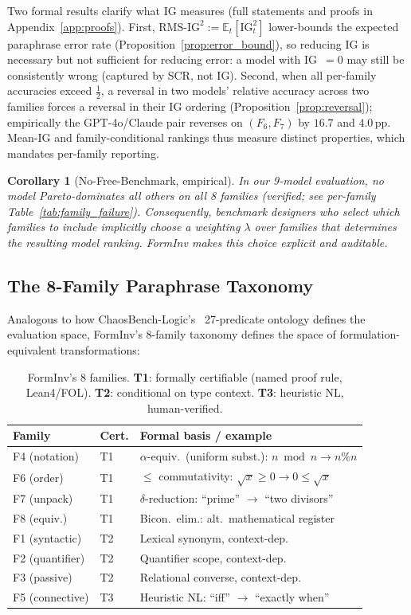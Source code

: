 \documentclass{article}
\newcommand{\IG}{\mathrm{IG}}
\newtheorem{corollary}[theorem]{Corollary}
\begin{document}
Two formal results clarify what IG measures (full statements and proofs in Appendix~\ref{app:proofs}). First, $\mathrm{RMS\text{-}IG}^2 := \mathbb{E}_t[\IG_t^2]$ lower-bounds the expected paraphrase error rate (Proposition~\ref{prop:error_bound}), so reducing IG is necessary but not sufficient for reducing error: a model with IG~$=0$ may still be consistently wrong (captured by SCR, not IG). Second, when all per-family accuracies exceed $\tfrac12$, a reversal in two models' relative accuracy across two families forces a reversal in their IG ordering (Proposition~\ref{prop:reversal}); empirically the GPT-4o/Claude pair reverses on $(F_6,F_7)$ by $16.7$ and $4.0$\,pp. Mean-IG and family-conditional rankings thus measure distinct properties, which mandates per-family reporting.

\begin{corollary}[No-Free-Benchmark, empirical]
\label{cor:nfb}
In our 9-model evaluation, no model Pareto-dominates all others on all 8 families (verified; see per-family Table~\ref{tab:family_failure}).
Consequently, benchmark designers who select which families to include implicitly choose a weighting
$\lambda$ over families that determines the resulting model ranking.
FormInv makes this choice explicit and auditable.
\end{corollary}

\subsection{The 8-Family Paraphrase Taxonomy}

Analogous to how ChaosBench-Logic's~\citep{chaosbench2026} 27-predicate ontology defines the evaluation space,
FormInv's 8-family taxonomy defines the space of formulation-equivalent transformations:

\begin{table}[h]
\centering\small
\caption{FormInv's 8 families. \textbf{T1}: formally certifiable (named proof rule, Lean4/FOL).
\textbf{T2}: conditional on type context. \textbf{T3}: heuristic NL, human-verified.}
\label{tab:families}
\begin{tabular}{llp{4.2cm}}
\toprule
Family & Cert. & Formal basis / example \\
\midrule
F4 (notation)   & T1 & $\alpha$-equiv.\ (uniform subst.): $n \bmod n \to n\%n$ \\
F6 (order)      & T1 & $\leq$ commutativity: $\sqrt{x}{\geq}0 \to 0{\leq}\sqrt{x}$ \\
F7 (unpack)     & T1 & $\delta$-reduction: ``prime'' $\to$ ``two divisors'' \\
F8 (equiv.)     & T1 & Bicon.\ elim.: alt.\ mathematical register \\
F1 (syntactic)  & T2 & Lexical synonym, context-dep. \\
F2 (quantifier) & T2 & Quantifier scope, context-dep. \\
F3 (passive)    & T2 & Relational converse, context-dep. \\
F5 (connective) & T3 & Heuristic NL: ``iff'' $\to$ ``exactly when'' \\
\bottomrule
\end{tabular}
\end{table}
\end{document}
